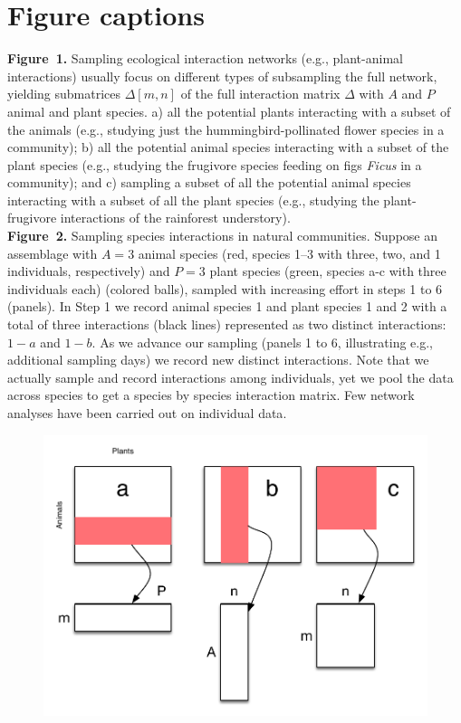 \documentclass[12pt]{article}
\begin{document}
\section*{Figure captions}
\noindent \textbf{Figure~1.} Sampling ecological interaction networks (e.g., plant-animal interactions) usually focus on different types of subsampling the full network, yielding submatrices $\Delta[m,n]$ of the full interaction matrix $\Delta$ with $A$ and $P$ animal and plant species. a) all the potential plants interacting with a subset of the animals (e.g., studying just the hummingbird-pollinated flower species in a community); b) all the potential animal species interacting with a subset of the plant species (e.g., studying the frugivore species feeding on figs \emph{Ficus} in a community); and c) sampling a subset of all the potential animal species interacting with a subset of all the plant species (e.g., studying the plant-frugivore interactions of the rainforest understory). \\
\noindent \textbf{Figure~2.} Sampling species interactions in natural communities. Suppose an assemblage with $A= 3$ animal species (red, species 1--3 with three, two, and 1 individuals, respectively) and $P= 3$ plant species (green, species a-c with three individuals each) (colored balls), sampled with increasing effort in steps 1 to 6 (panels). In Step 1 we record animal species 1 and plant species 1 and 2 with a total of three interactions (black lines) represented as two distinct interactions: $1-a$ and $1-b$. As we advance our sampling (panels 1 to 6, illustrating e.g., additional sampling days) we record new distinct interactions. Note that we actually sample and record interactions among individuals, yet we pool the data across species to get a species by species interaction matrix. Few network analyses have been carried out on individual data\citep{Dupont:2014ex}. \\
\newpage
\begin{figure}[h!]
  \caption{}
  \label{Fig1}
  \begin{center}
    \includegraphics[width=16cm]{../figures/Fig1.pdf}
  \end{center}
\end{figure}
\end{document}

